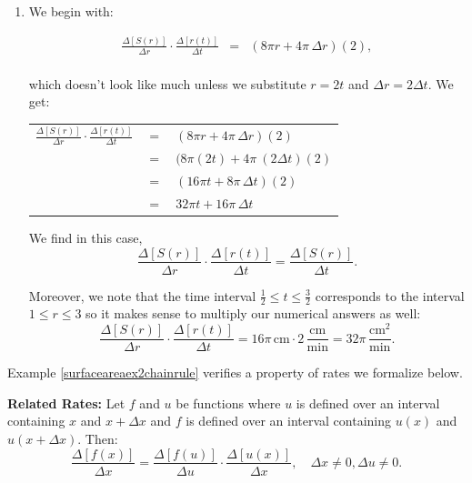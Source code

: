 \documentclass{ximera}
\begin{document}
\begin{example}
\begin{explanation}
\begin{enumerate}
\item  We begin with: 
 
\[ \begin{array}{rcl}

\frac{\Delta[S(r)]}{\Delta r}  \cdot \frac{\Delta[r(t)]}{\Delta t} & = & (8 \pi r + 4 \pi \, \Delta r)(2),   \\ \end{array} \]

 which doesn't look like much unless we substitute $r = 2t$ and $\Delta r = 2 \Delta t$.  We get:

\begin{longtable}{rcl}

$\frac{\Delta[S(r)]}{\Delta r}  \cdot \frac{\Delta[r(t)]}{\Delta t}$ & $=$ & $(8 \pi r + 4 \pi \, \Delta r)(2)$   \\
                 & $=$ & $(8 \pi (2t) + 4 \pi \ (2 \Delta t)(2)$\\
                 & $=$ & $(16 \pi t + 8 \pi \,  \Delta t)(2)$\\
                  & $=$ & $32 \pi t + 16 \pi \,  \Delta t$ \\ \end{longtable} 
                     
We find in this case,   \[ \frac{\Delta[S(r)]}{\Delta r}  \cdot \frac{\Delta[r(t)]}{\Delta t}   =  \frac{\Delta[S(r)]}{\Delta t}.\] 

Moreover, we note that the time interval $\frac{1}{2} \leq t \leq \frac{3}{2}$ corresponds to the interval $1 \leq r \leq 3$ so it makes sense to multiply our numerical answers as well: \[ \frac{\Delta[S(r)]}{\Delta r}  \cdot \frac{\Delta[r(t)]}{\Delta t} = 16 \pi \, \text{cm} \cdot 2 \, \frac{\text{cm}}{\text{min}} = 32 \pi \, \frac{\text{cm}^2}{\text{min}}.\]
	 
\end{enumerate}

\end{explanation}
\end{example}

Example \ref{surfaceareaex2chainrule} verifies a property of rates we formalize below.


\begin{theorem}\label{relatedratesaroc} \textbf{Related Rates:} 
Let $f$ and $u$ be functions where $u$ is defined over an interval containing $x$ and $x+\Delta x$ and $f$ is defined over an interval containing $u(x)$ and $u(x + \Delta x)$.  Then:
\[ \frac{ \Delta[f(x)]}{\Delta x} =  \frac{ \Delta[f(u)]}{\Delta u}  \cdot  \frac{ \Delta[u(x)]}{\Delta x}, \quad \Delta x \neq 0,  \Delta u  \neq 0. \]

\end{theorem}
\end{document}
